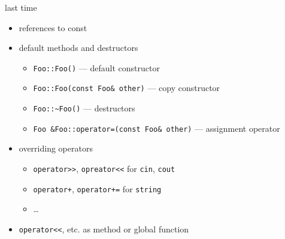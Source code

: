 \begin{frame}[fragile,label=lastTime]{last time}
\lstset{language=C++,style=small}
    \begin{itemize}
    \item references to const
    \item default methods and destructors
        \begin{itemize}
            \item \lstinline|Foo::Foo()| --- default constructor
            \item \lstinline|Foo::Foo(const Foo& other)| --- copy constructor
            \item \lstinline|Foo::~Foo()| --- destructors
            \item \lstinline|Foo &Foo::operator=(const Foo& other)| --- assignment operator
        \end{itemize}
    \item overriding operators
        \begin{itemize}
            \item \lstinline|operator>>|, \lstinline|opreator<<| for \lstinline|cin|, \lstinline|cout|
            \item \lstinline|operator+|, \lstinline|operator+=| for \lstinline|string|
            \item \ldots
        \end{itemize}
    \item \lstinline|operator<<|, etc. as method or global function
    \end{itemize}
\end{frame}
